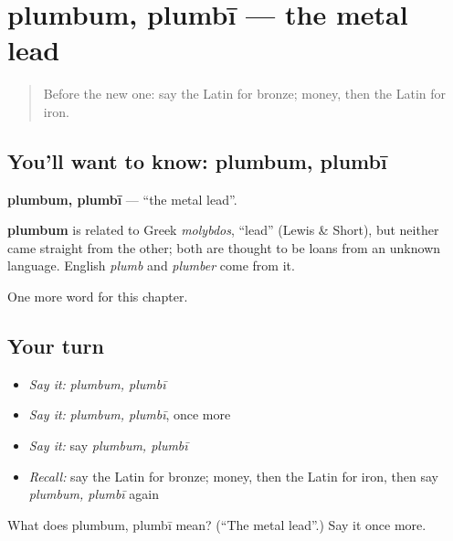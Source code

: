 \section[plumbum, plumbī]{plumbum, plumbī — the metal lead}

\label{lesson:LA-C222-plumbum}



\begin{quote}
Before the new one: say the Latin for bronze; money, then the Latin for iron.
\end{quote}

\subsection*{You'll want to know: plumbum, plumbī}
\textbf{plumbum, plumbī} — \textquotedblleft{}the metal lead\textquotedblright{}.

\begin{cousinweb}
\textbf{plumbum} is related to Greek \emph{molybdos}, \textquotedblleft{}lead\textquotedblright{} (Lewis \& Short), but neither came straight from the other; both are thought to be loans from an unknown language. English \emph{plumb} and \emph{plumber} come from it.
\end{cousinweb}

\begin{grammarlens}[title={What you've built}]
One more word for this chapter.
\end{grammarlens}

\subsection*{Your turn}
\begin{itemize}
\raggedright
  \item \emph{Say it:} \emph{plumbum, plumbī}
  \item \emph{Say it:} \emph{plumbum, plumbī}, once more
  \item \emph{Say it:} say \emph{plumbum, plumbī}
  \item \emph{Recall:} say the Latin for bronze; money, then the Latin for iron, then say \emph{plumbum, plumbī} again
\end{itemize}

\begin{tcolorbox}[breakable,colback=teal!4,colframe=teal!35!black,title={Before you move on}]
What does plumbum, plumbī mean? (\textquotedblleft{}The metal lead\textquotedblright{}.) Say it once more.
\end{tcolorbox}
